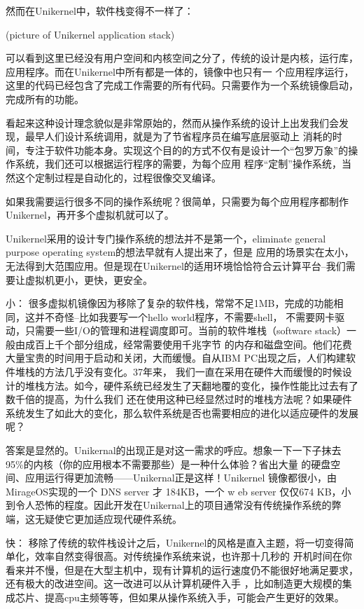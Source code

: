 \documentclass[fontsize=13pt, %
    paper=a4, %
    twoside, %
    captions=tableheading,
    index=totoc,
    hyperref]{labbook}
\begin{document}
\begin{spacing}{1.0}
\begin{addmargin}[4cm]{0cm}
然而在Unikernel中，软件栈变得不一样了：

(picture of Unikernel application stack)

可以看到这里已经没有用户空间和内核空间之分了，传统的设计是内核，运行库，应用程序。而在Unikernel中所有都是一体的，镜像中也只有一
个应用程序运行，这里的代码已经包含了完成工作需要的所有代码。只需要作为一个系统镜像启动，完成所有的功能。

看起来这种设计理念貌似是非常原始的，然而从操作系统的设计上出发我们会发现，最早人们设计系统调用，就是为了节省程序员在编写底层驱动上
消耗的时间，专注于软件功能本身。实现这个目的的方式不仅有是设计一个“包罗万象”的操作系统，我们还可以根据运行程序的需要，为每个应用
程序“定制”操作系统，当然这个定制过程是自动化的，过程很像交叉编译。

如果我需要运行很多不同的操作系统呢？很简单，只需要为每个应用程序都制作Unikernel，再开多个虚拟机就可以了。


Unikernel采用的设计专门操作系统的想法并不是第一个，eliminate general purpose operating system的想法早就有人提出来了，但是
应用的场景实在太小，无法得到大范围应用。但是现在Unikernel的适用环境恰恰符合云计算平台--我们需要让虚拟机更小，更快，更安全。

小： 很多虚拟机镜像因为移除了复杂的软件栈，常常不足1MB，完成的功能相同，这并不奇怪--比如我要写一个hello world程序，不需要shell，
不需要网卡驱动，只需要一些I/O的管理和进程调度即可。当前的软件堆栈（software stack）一般由成百上千个部分组成，经常需要使用千兆字节
的内存和磁盘空间。他们花费大量宝贵的时间用于启动和关闭，大而缓慢。自从IBM PC出现之后，人们构建软件堆栈的方法几乎没有变化。37年来，
我们一直在采用在硬件大而缓慢的时候设计的堆栈方法。如今，硬件系统已经发生了天翻地覆的变化，操作性能比过去有了数千倍的提高，为什么我们
还在使用这种已经显然过时的堆栈方法呢？如果硬件系统发生了如此大的变化，那么软件系统是否也需要相应的进化以适应硬件的发展呢？

答案是显然的。Unikernal的出现正是对这一需求的呼应。想象一下一下子抹去95\%的内核（你的应用根本不需要那些）是一种什么体验？省出大量
的硬盘空间、应用运行得更加流畅——Unikernal正是这样！Unikernel 镜像都很小，由 MirageOS实现的一个 DNS server 才 184KB，一个 w
eb server 仅仅674 KB，小到令人恐怖的程度。因此开发在Unikernal上的项目通常没有传统操作系统的弊端，这无疑使它更加适应现代硬件系统。

快： 移除了传统的软件栈设计之后，Unikernel的风格是直入主题，将一切变得简单化，效率自然变得很高。对传统操作系统来说，也许那十几秒的
开机时间在你看来并不慢，但是在大型主机中，现有计算机的运行速度仍不能很好地满足要求，还有极大的改进空间。这一改进可以从计算机硬件入手
，比如制造更大规模的集成芯片、提高cpu主频等等，但如果从操作系统入手，可能会产生更好的效果。


\end{addmargin}
\end{spacing}
\end{document}
